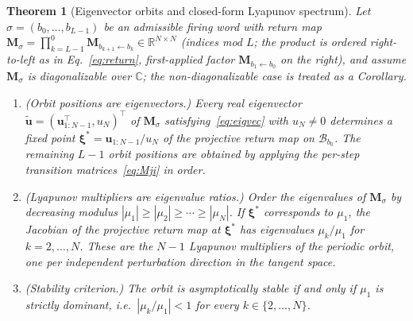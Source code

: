 \documentclass[12pt]{article}
\newcommand{\vv}[1]{\mathbf{#1}}
\newcommand{\xxi}{\boldsymbol{\xi}}
\newcommand{\RR}{\mathbb{R}}
\newcommand{\CC}{\mathbb{C}}
\newcommand{\Bsp}{\mathcal{B}}
\newtheorem{theorem}{Theorem}
\begin{document}
\begin{theorem}[Eigenvector orbits and closed-form Lyapunov spectrum]\label{thm:eigvec}
Let $\sigma=(b_0,\ldots,b_{L-1})$ be an admissible firing word with return map $\vv{M}_\sigma=\prod_{k=L-1}^{0}\vv{M}_{b_{k+1}\leftarrow b_k}\in\RR^{N\times N}$ (indices mod $L$; the product is ordered right-to-left as in Eq.~\eqref{eq:return}, first-applied factor $\vv{M}_{b_1\leftarrow b_0}$ on the right), \emph{and assume $\vv{M}_\sigma$ is diagonalizable over $\CC$}; the non-diagonalizable case is treated as a Corollary.
\begin{enumerate}[label=(\roman*)]
\item \emph{(Orbit positions are eigenvectors.)} Every real eigenvector $\tilde{\vv{u}}=(\vv{u}_{1:N-1}^\top,u_N)^\top$ of $\vv{M}_\sigma$ satisfying~\eqref{eq:eigvec} with $u_N\neq 0$ determines a fixed point $\xxi^*=\vv{u}_{1:N-1}/u_N$ of the projective return map on $\Bsp_{b_0}$. The remaining $L-1$ orbit positions are obtained by applying the per-step transition matrices~\eqref{eq:Mji} in order.
\item \emph{(Lyapunov multipliers are eigenvalue ratios.)} Order the eigenvalues of $\vv{M}_\sigma$ by decreasing modulus $|\mu_1|\geq|\mu_2|\geq\cdots\geq|\mu_N|$. If $\xxi^*$ corresponds to $\mu_1$, the Jacobian of the projective return map at $\xxi^*$ has eigenvalues $\mu_k/\mu_1$ for $k=2,\ldots,N$. These are the $N-1$ Lyapunov multipliers of the periodic orbit, one per independent perturbation direction in the tangent space.
\item \emph{(Stability criterion.)} The orbit is asymptotically stable if and only if $\mu_1$ is \emph{strictly} dominant, i.e.\ $|\mu_k/\mu_1|<1$ for every $k\in\{2,\ldots,N\}$.
\end{enumerate}
\end{theorem}
\end{document}
